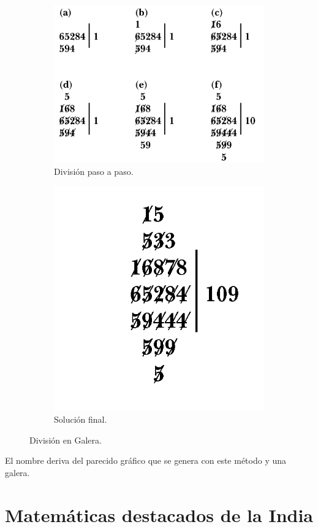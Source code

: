 \documentclass[12pt, aspectratio=169]{beamer} %
\begin{document}
		\begin{frame}
			\begin{figure}
			\centering
				\begin{subfigure}{.5\textwidth}
					\centering
					\includegraphics[width = .75\linewidth]{Galley_Method3.png}
					\caption{División paso a paso.}
				\end{subfigure}%
				\begin{subfigure}{.5\textwidth}
					\centering
					\includegraphics[width = .5\linewidth]{Galley_Method4.png}
					\caption{Solución final.}
				\end{subfigure}
				\caption{División en Galera.}
			\end{figure}
			
			\pause
			
			El nombre deriva del parecido gráfico que se genera con este método y una galera.
		\end{frame}

\section{Matemáticas destacados de la India}
\end{document}
